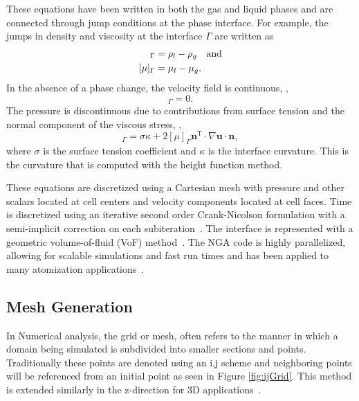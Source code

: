 These equations have been written in both the gas and liquid phases and are connected through jump conditions at the phase interface.
For example, the jumps in density and viscosity at the interface
$\Gamma$ are written as 
\begin{align}
[\rho]_\Gamma&%
=\rho_l-\rho_g \label{eqn:rho}\mbox{\quad and}\\
[\mu]_\Gamma&%
=\mu_l-\mu_g.
\label{eqn:mu}
\end{align}
In the absence of a phase change, the velocity field is continuous, \ie,
\begin{equation}
[\bm{u}]_\Gamma=0.
\end{equation}
The pressure is discontinuous due to contributions from surface tension and the normal component of the viscous stress, \ie,
\begin{equation}
[p]_\Gamma=\sigma\kappa+ 2\left[\mu\right]_\Gamma\bm{n}^\mathsf{T}\cdot\nabla\bm{u}\cdot\bm{n},
\end{equation}
where
$\sigma$ is the surface tension coefficient and
$\kappa$ is the interface curvature. This is the curvature that is computed with the height function method.

These equations are discretized using a Cartesian mesh with pressure and other scalars located at cell centers and velocity components located at cell faces. Time is discretized using an iterative second order Crank-Nicolson formulation with a semi-implicit correction on each subiteration~\cite{choi}. The interface is represented with a geometric volume-of-fluid (VoF) method~\cite{Owkes2017,Owkes2014}. The NGA code is highly parallelized, allowing for scalable simulations and fast run times and has been applied to many atomization applications~\cite{OwkesAIAA,Desjardins2013,sheehy}.

\subsection{Mesh Generation}
In Numerical analysis, the grid or mesh, often refers to the manner in which a domain being simulated is subdivided into smaller sections and points. Traditionally these points are denoted using an i,j scheme and neighboring points will be referenced from an initial point as seen in Figure \ref{fig:ijGrid}. This method is extended similarly in the z-direction for 3D applications~\cite{MIT}.  

